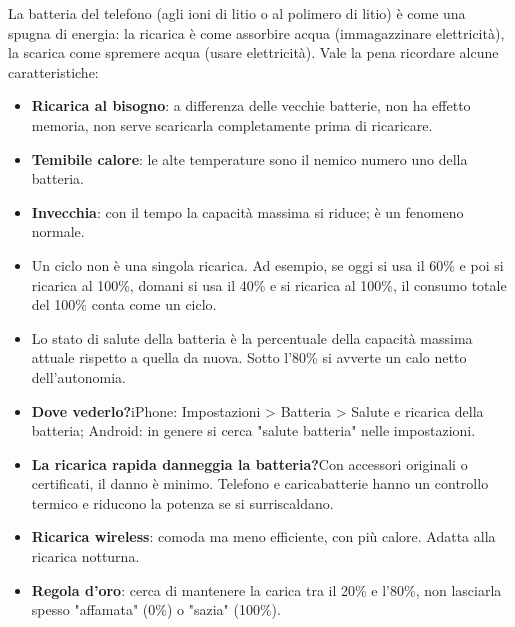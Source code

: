 


La batteria del telefono (agli ioni di litio o al polimero di litio) è come una spugna di energia: la ricarica è come assorbire acqua (immagazzinare elettricità), la scarica come spremere acqua (usare elettricità). Vale la pena ricordare alcune caratteristiche:

\begin{itemize}
  \item \textbf{Ricarica al bisogno}: a differenza delle vecchie batterie, non ha effetto memoria, non serve scaricarla completamente prima di ricaricare.
  \item \textbf{Temibile calore}: le alte temperature sono il nemico numero uno della batteria.
  \item \textbf{Invecchia}: con il tempo la capacità massima si riduce; è un fenomeno normale.
\end{itemize}


\begin{itemize}
  \item Un ciclo non è una singola ricarica. Ad esempio, se oggi si usa il 60\% e poi si ricarica al 100\%, domani si usa il 40\% e si ricarica al 100\%, il consumo totale del 100\% conta come un ciclo.
  \item Lo stato di salute della batteria è la percentuale della capacità massima attuale rispetto a quella da nuova. Sotto l'80\% si avverte un calo netto dell'autonomia.
  \item \textbf{Dove vederlo?}iPhone: Impostazioni > Batteria > Salute e ricarica della batteria; Android: in genere si cerca "salute batteria" nelle impostazioni.
\end{itemize}


\begin{itemize}
  \item \textbf{La ricarica rapida danneggia la batteria?}Con accessori originali o certificati, il danno è minimo. Telefono e caricabatterie hanno un controllo termico e riducono la potenza se si surriscaldano.
  \item \textbf{Ricarica wireless}: comoda ma meno efficiente, con più calore. Adatta alla ricarica notturna.
  \item \textbf{Regola d'oro}: cerca di mantenere la carica tra il 20\% e l'80\%, non lasciarla spesso "affamata" (0\%) o "sazia" (100\%).
\end{itemize}

